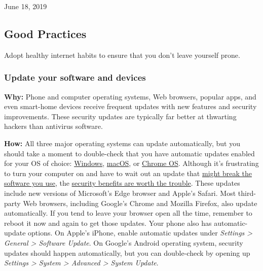 June 18, 2019

\hypertarget{good-practices}{%
\subsection{Good Practices}\label{good-practices}}

Adopt healthy internet habits to ensure that you don't leave yourself
prone.~

\hypertarget{update-your-software-and-devices}{%
\subsubsection{Update your software and
devices}\label{update-your-software-and-devices}}

\textbf{Why:} Phone and computer operating systems, Web browsers,
popular apps, and even smart-home devices receive frequent updates with
new features and security improvements. These security updates are
typically far better at thwarting hackers than antivirus software.

\textbf{How:} All three major operating systems can update
automatically, but you should take a moment to double-check that you
have automatic updates enabled for your OS of choice:
\href{https://support.microsoft.com/en-us/help/12373/windows-update-faq}{Windows},
\href{https://support.apple.com/guide/mac-help/get-macos-updates-mchlpx1065/mac}{macOS},
or
\href{https://support.google.com/chrome/a/answer/3168106?hl=en}{Chrome
OS}. Although it's frustrating to turn your computer on and have to wait
out an update that
\href{https://www.nytimes.com/2017/02/24/technology/personaltech/automatic-update-headaches.html}{might
break the software you use}, the
\href{https://www.nytimes.com/2019/03/27/opinion/asus-malware-hack.html}{security
benefits are worth the trouble}. These updates include new versions of
Microsoft's Edge browser and Apple's Safari. Most third-party Web
browsers, including Google's Chrome and Mozilla Firefox, also update
automatically. If you tend to leave your browser open all the time,
remember to reboot it now and again to get those updates. Your phone
also has automatic-update options. On Apple's iPhone, enable automatic
updates under \emph{Settings \textgreater{} General \textgreater{}
Software Update}. On Google's Android operating system, security updates
should happen automatically, but you can double-check by opening up
\emph{Settings \textgreater{} System \textgreater{} Advanced
\textgreater{} System Update}.


